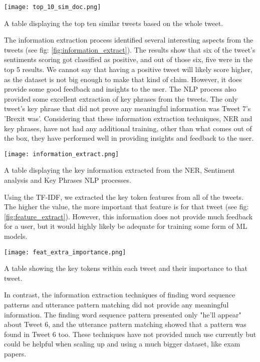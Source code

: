 	\begin{table}[h]
		\centering
		\texttt{[image: top\_10\_sim\_doc.png]}
		\caption{A table displaying the top ten similar tweets based on the whole tweet.}
		\label{fig:top_10_sim_doc}
		
	\end{table}

	The information extraction process identified several interesting aspects from the tweets (see fig: \ref{fig:information_extract}). The results show that six of the tweet's sentiments scoring got classified as positive, and out of those six, five were in the top 5 results. We cannot say that having a positive tweet will likely score higher, as the dataset is not big enough to make that kind of claim. However, it does provide some good feedback and insights to the user. The NLP process also provided some excellent extraction of key phrases from the tweets. The only tweet's key phrase that did not prove any meaningful information was Tweet 7's 'Brexit was'. Considering that these information extraction techniques, NER and key phrases, have not had any additional training, other than what comes out of the box, they have performed well in providing insights and feedback to the user.


	\begin{table}[h]
		\centering
		\texttt{[image: information\_extract.png]}
		\caption{A table displaying the key information extracted from the NER, Sentiment analysis and Key Phrases NLP processes.}
		\label{fig:information_extract}
		
	\end{table}

	Using the TF-IDF, we extracted the key token features from all of the tweets. The higher the value, the more important that feature is for that tweet (see fig: \ref{fig:feature_extract}). However, this information does not provide much feedback for a user, but it would highly likely be adequate for training some form of ML models.

	\begin{table}[h]
		\centering
		\texttt{[image: feat\_extra\_importance.png]}
		\caption{A table showing the key tokens within each tweet and their importance to that tweet.}
		\label{fig:feature_extract}
		
	\end{table}

	In contrast, the information extraction techniques of finding word sequence patterns and utterance pattern matching did not provide any meaningful information. The finding word sequence pattern presented only "he'll appear" about Tweet 6, and the utterance pattern matching showed that a pattern was found in Tweet 6 too. These techniques have not provided much use currently but could be helpful when scaling up and using a much bigger dataset, like exam papers.




